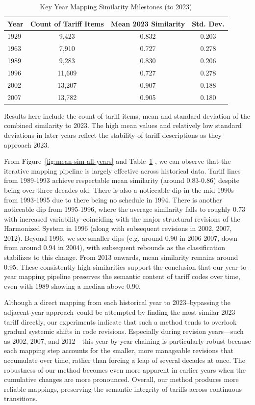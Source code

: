 \documentclass[12pt]{article}
\begin{document}
\begin{table}[H]
\centering
\caption{Key Year Mapping Similarity Milestones (to 2023)}
\label{tab:milestone_similarity}
\begin{tabular}{lccc}
\toprule
\textbf{Year} & \textbf{Count of Tariff Items} & \textbf{Mean 2023 Similarity} & \textbf{Std. Dev.} \\
\midrule
1929 & 9,423  & 0.832 & 0.203 \\
1963 & 7,910  & 0.727 & 0.278 \\
1989 & 9,283  & 0.830 & 0.206 \\
1996 & 11,609 & 0.727 & 0.278 \\
2002 & 13,207 & 0.907 & 0.188 \\
2007 & 13,782 & 0.905 & 0.180 \\
\bottomrule
\end{tabular}
\end{table}

Results here include the count of tariff items, mean and standard deviation of the combined similarity to 2023. The high mean values and relatively low standard deviations in later years reflect the stability of tariff descriptions as they approach 2023.
\newline

From Figure~\ref{fig:mean-sim-all-years} and Table~\ref{tab:milestone_similarity}  , we can observe that the iterative mapping pipeline is largely effective across historical data. Tariff lines from 1989-1993 achieve respectable mean similarity (around 0.83-0.86) despite being over three decades old. There is also a noticeable dip in the mid-1990s--from 1993-1995 due to there being no schedule in 1994. There is another noticeable dip from 1995-1996, where the average similarity falls to roughly $0.73$ with increased variability--coinciding with the major structural revisions of the Harmonized System in 1996 (along with subsequent revisions in 2002, 2007, 2012). Beyond 1996, we see smaller dips (e.g. around 0.90 in 2006-2007, down from around 0.94 in 2004), with subsequent rebounds as the classification stabilizes to this change. From 2013 onwards, mean similarity remains around 0.95. These consistently high similarities support the conclusion that our year-to-year mapping pipeline preserves the semantic content of tariff codes over time, even with 1989 showing a median above 0.90.

Although a direct mapping from each historical year to 2023--bypassing the adjacent-year approach--could be attempted by finding the most similar 2023 tariff directly, our experiments indicate that such a method tends to overlook gradual systemic shifts in code revisions. Especially during revision years—such as 2002, 2007, and 2012—this year‐by‐year chaining is particularly robust because each mapping step accounts for the smaller, more manageable revisions that accumulate over time, rather than forcing a leap of several decades at once. The robustness of our method becomes even more apparent in earlier years when the cumulative changes are more pronounced. Overall, our method produces more reliable mappings, preserving the semantic integrity of tariffs across continuous transitions. 
\end{document}
